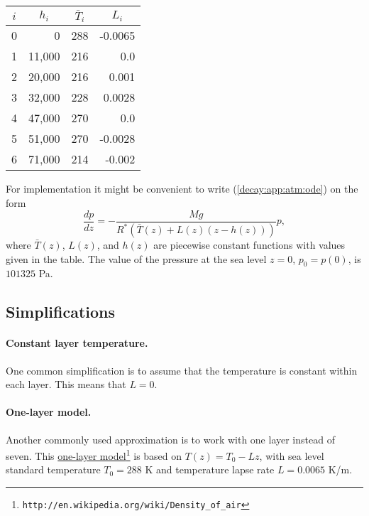 \documentclass[graybox,sectrefs,envcountresetchap,open=right,final]{svmonodo}
\begin{document}
{\small   %

\vspace{4mm}

\begin{tabular}{lrrr}
\hline
\multicolumn{1}{c}{ $i$ } & \multicolumn{1}{c}{ $h_i$ } & \multicolumn{1}{c}{ $\bar T_i$ } & \multicolumn{1}{c}{ $L_i$ } \\
\hline
0   & 0      & 288        & -0.0065 \\
1   & 11,000 & 216        & 0.0     \\
2   & 20,000 & 216        & 0.001   \\
3   & 32,000 & 228        & 0.0028  \\
4   & 47,000 & 270        & 0.0     \\
5   & 51,000 & 270        & -0.0028 \\
6   & 71,000 & 214        & -0.002  \\
\hline
\end{tabular}

\vspace{4mm}

}


\noindent
For implementation it might be convenient to write (\ref{decay:app:atm:ode})
on the form
\begin{equation}
\frac{dp}{dz} = -\frac{Mg}{R^*(\bar T(z) + L(z)(z-h(z)))} p,
\end{equation}
where $\bar T(z)$, $L(z)$, and $h(z)$ are piecewise constant
functions with values given in the table.
The value of the pressure at the sea level $z=0$, $p_0=p(0)$, is $101325$ Pa.

\subsection{Simplifications}

\paragraph{Constant layer temperature.}
One common simplification is to assume that the temperature is
constant within each layer. This means that $L=0$.

\paragraph{One-layer model.}
Another commonly used approximation is to work with one layer instead of
seven. This \href{{http://en.wikipedia.org/wiki/Density_of_air}}{one-layer model}\footnote{\texttt{http://en.wikipedia.org/wiki/Density\_of\_air}}
is based on $T(z)=T_0 - Lz$, with
sea level standard temperature $T_0=288$ K and
temperature lapse rate $L=0.0065$ K/m.
\end{document}
